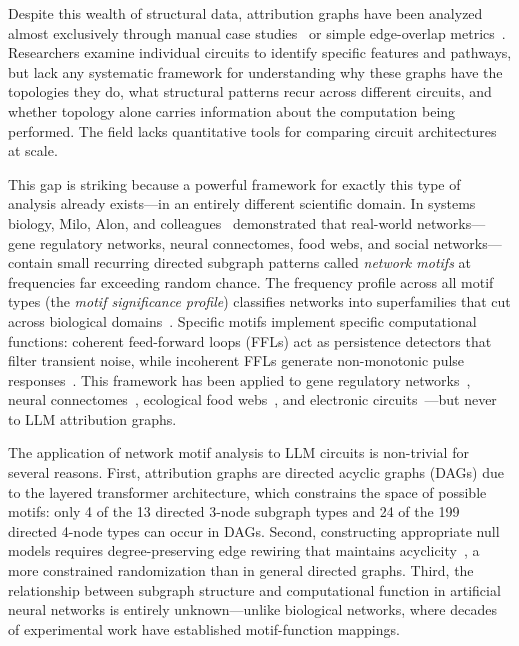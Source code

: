 \documentclass[11pt,letterpaper]{article}
\begin{document}
Despite this wealth of structural data, attribution graphs have been analyzed almost exclusively through manual case studies~\citep{Anthropic2025} or simple edge-overlap metrics~\citep{Sun2025}. Researchers examine individual circuits to identify specific features and pathways, but lack any systematic framework for understanding why these graphs have the topologies they do, what structural patterns recur across different circuits, and whether topology alone carries information about the computation being performed. The field lacks quantitative tools for comparing circuit architectures at scale.

This gap is striking because a powerful framework for exactly this type of analysis already exists---in an entirely different scientific domain. In systems biology, Milo, Alon, and colleagues~\citep{Milo2002, Milo2004} demonstrated that real-world networks---gene regulatory networks, neural connectomes, food webs, and social networks---contain small recurring directed subgraph patterns called \emph{network motifs} at frequencies far exceeding random chance. The frequency profile across all motif types (the \emph{motif significance profile}) classifies networks into superfamilies that cut across biological domains~\citep{Milo2004}. Specific motifs implement specific computational functions: coherent feed-forward loops (FFLs) act as persistence detectors that filter transient noise, while incoherent FFLs generate non-monotonic pulse responses~\citep{ShenOrr2002, Alon2007}. This framework has been applied to gene regulatory networks~\citep{ShenOrr2002}, neural connectomes~\citep{Milo2002}, ecological food webs~\citep{Milo2002}, and electronic circuits~\citep{Milo2004}---but never to LLM attribution graphs.

The application of network motif analysis to LLM circuits is non-trivial for several reasons. First, attribution graphs are directed acyclic graphs (DAGs) due to the layered transformer architecture, which constrains the space of possible motifs: only 4 of the 13 directed 3-node subgraph types and 24 of the 199 directed 4-node types can occur in DAGs. Second, constructing appropriate null models requires degree-preserving edge rewiring that maintains acyclicity~\citep{Goni2014}, a more constrained randomization than in general directed graphs. Third, the relationship between subgraph structure and computational function in artificial neural networks is entirely unknown---unlike biological networks, where decades of experimental work have established motif-function mappings.
\end{document}
